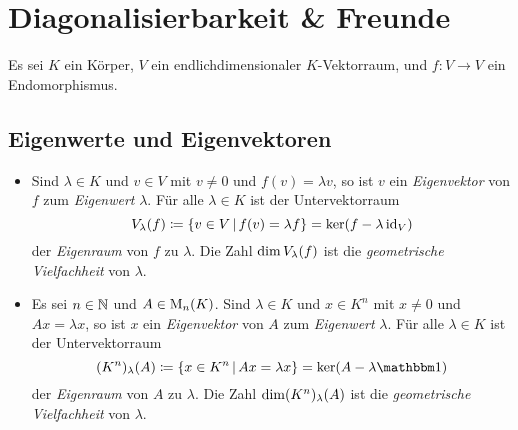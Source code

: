 \chapter{Diagonalisierbarkeit \& Freunde}

Es sei $K$ ein Körper, $V$ ein endlichdimensionaler $K$-Vektorraum, und $f \colon V \to V$ ein Endomorphismus.





\section{Eigenwerte und Eigenvektoren}

\begin{definition}
  \leavevmode
  \begin{itemize}
    \item
      Sind $\lambda \in K$ und $v \in V$ mit $v \neq 0$ und $f(v) = \lambda v$, so ist $v$ ein \emph{Eigenvektor} von $f$ zum \emph{Eigenwert} $\lambda$.
      Für alle $\lambda \in K$ ist der Untervektorraum
      \[
                  V_{\lambda}(f)
        \coloneqq \{ v \in V \,|\, f(v) = \lambda f \}
        =         \ker (f - \lambda \operatorname{id}_V)
      \]
      der \emph{Eigenraum} von $f$ zu $\lambda$.
      Die Zahl $\dim V_{\lambda}(f)$ ist die \emph{geometrische Vielfachheit} von $\lambda$.
    \item
      Es sei $n \in \mathbb{N}$ und $A \in \operatorname{M}_{n}(K)$.
      Sind $\lambda \in K$ und $x \in K^n$ mit $x \neq 0$ und $Ax = \lambda x$, so ist $x$ ein \emph{Eigenvektor} von $A$ zum \emph{Eigenwert} $\lambda$.
      Für alle $\lambda \in K$ ist der Untervektorraum
      \[
                  \eigenspace{(K^n)}{A}{\lambda}
        \coloneqq \{ x \in K^n \suchthat Ax = \lambda x \}
        =         \ker (A - \lambda \Id)
      \]
      der \emph{Eigenraum} von $A$ zu $\lambda$.
      Die Zahl $\dim (K^n)_{\lambda}(A)$ ist die \emph{geometrische Vielfachheit} von $\lambda$.
  \end{itemize}
\end{definition}

